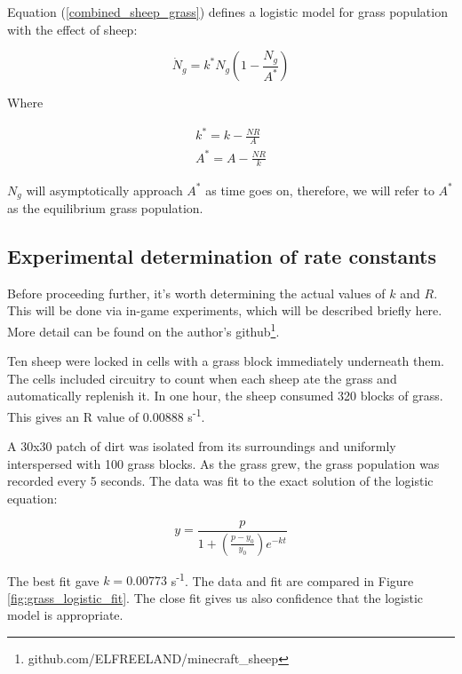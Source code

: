 \documentclass{article}
\begin{document}
Equation (\ref{combined_sheep_grass}) defines a logistic model for grass population with the effect of sheep:

\begin{equation}
    \label{combined_sheep_grass}
    \dot{N}_g=k^*N_g\left(1-\frac{N_g}{A^*}\right)
\end{equation}

Where

\begin{equation*}
    \begin{split}
        k^*=k-\frac{NR}{A}\\
        A^*=A-\frac{NR}{k}
    \end{split}
\end{equation*}

$N_g$ will asymptotically approach $A^*$ as time goes on, therefore, we will refer to $A^*$ as the equilibrium grass population.

\subsection{Experimental determination of rate constants} \label{sec:experimental}

Before proceeding further, it's worth determining the actual values of $k$ and $R$. This will be done via in-game experiments, which will be described briefly here. More detail can be found on the author's github\footnote{github.com/ELFREELAND/minecraft\_sheep}.

Ten sheep were locked in cells with a grass block immediately underneath them. The cells included circuitry to count when each sheep ate the grass and automatically replenish it. In one hour, the sheep consumed 320 blocks of grass. This gives an R value of 0.00888 s\textsuperscript{-1}.

A 30x30 patch of dirt was isolated from its surroundings and uniformly interspersed with 100 grass blocks. As the grass grew, the grass population was recorded every 5 seconds. The data was fit to the exact solution of the logistic equation:

\begin{equation}
    \label{logistic_exact}
    y = \frac{p}{1+\left(\frac{p-y_0}{y_0}\right)e^{-kt}}
\end{equation}

The best fit gave $k=0.00773$ s\textsuperscript{-1}. The data and fit are compared in Figure \ref{fig:grass_logistic_fit}. The close fit gives us also confidence that the logistic model is appropriate.
\end{document}
